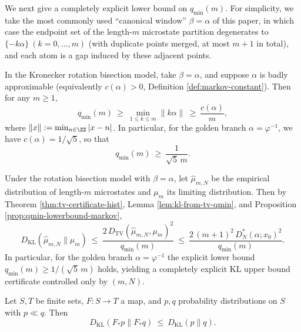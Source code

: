 We next give a completely explicit lower bound on \(q_{\min}(m)\). For simplicity, we take the most commonly used ``canonical window'' \(\beta=\alpha\) of this paper, in which case the endpoint set of the length-\(m\) microstate partition degenerates to \(\{ -k\alpha\}\ (k=0,\dots,m)\) (with duplicate points merged, at most \(m{+}1\) in total), and each atom is a gap induced by these adjacent points.

\begin{proposition}\label{prop:qmin-lowerbound-markov}
In the Kronecker rotation bisection model, take \(\beta=\alpha\), and suppose \(\alpha\) is badly approximable (equivalently \(c(\alpha)>0\), Definition \ref{def:markov-constant}). Then for any \(m\ge 1\),
\[
q_{\min}(m)\ \ge\ \min_{1\le k\le m}\|k\alpha\|\ \ge\ \frac{c(\alpha)}{m},
\]
where \(\|x\|:=\min_{n\in\ZZ}|x-n|\). In particular, for the golden branch \(\alpha=\varphi^{-1}\), we have \(c(\alpha)=1/\sqrt5\), so that
\[
q_{\min}(m)\ \ge\ \frac{1}{\sqrt5\,m}.
\]
\end{proposition}

\begin{corollary}\label{cor:rotation-microstate-kl-certificate}
Under the rotation bisection model with \(\beta=\alpha\), let \(\hat\mu_{m,N}\) be the empirical distribution of length-\(m\) microstates and \(\mu_m\) its limiting distribution. Then by Theorem \ref{thm:tv-certificate-hist}, Lemma \ref{lem:kl-from-tv-qmin}, and Proposition \ref{prop:qmin-lowerbound-markov},
\[
D_{\mathrm{KL}}(\hat\mu_{m,N}\|\mu_m)
\ \le\ \frac{2\,D_{\mathrm{TV}}(\hat\mu_{m,N},\mu_m)^2}{q_{\min}(m)}
\ \le\ \frac{2\,(m+1)^2\,D_N^*(\alpha;x_0)^2}{q_{\min}(m)}.
\]
In particular, for the golden branch \(\alpha=\varphi^{-1}\) the explicit lower bound \(q_{\min}(m)\ge 1/(\sqrt5\,m)\) holds, yielding a completely explicit KL upper bound certificate controlled only by \((m,N)\).
\end{corollary}



\begin{lemma}\label{lem:kl-monotone-pushforward}
Let $S,T$ be finite sets, $F:S\to T$ a map, and $p,q$ probability distributions on $S$ with $p\ll q$. Then
\[
D_{\mathrm{KL}}(F_*p\|F_*q)\ \le\ D_{\mathrm{KL}}(p\|q).
\]
\end{lemma}

